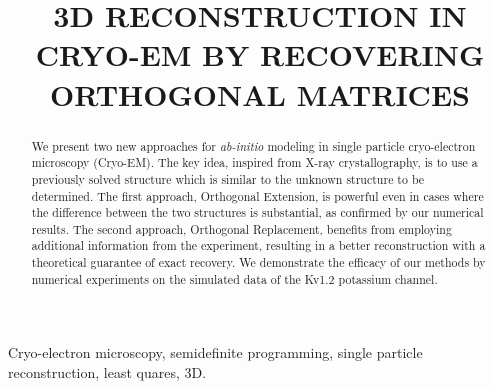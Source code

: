 \documentclass{article}
\title{3D RECONSTRUCTION IN CRYO-EM BY RECOVERING ORTHOGONAL MATRICES}
\begin{document}
%
\maketitle
%
\begin{abstract}

We present two new approaches for \textit{ab-initio} modeling in single particle
cryo-electron microscopy (Cryo-EM). The key idea, inspired from X-ray crystallography, is
to use a previously solved structure which is similar to the unknown structure to be
determined. The first
approach, Orthogonal Extension, is powerful even in cases where the difference between the
two structures is substantial, as confirmed by our numerical results. The second approach,
Orthogonal Replacement, benefits from employing additional information from the
experiment, resulting in a better reconstruction with a theoretical guarantee of exact
recovery. We demonstrate the efficacy of our methods by numerical experiments on the
simulated data of the Kv1.2 potassium channel.

\end{abstract}
%
\begin{keywords}
Cryo-electron microscopy, semidefinite programming, single particle reconstruction, least quares, 3D.
\end{keywords}
%
\end{document}

